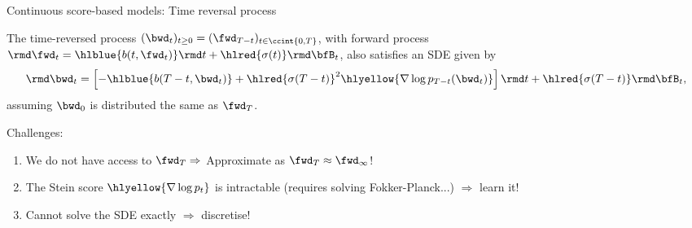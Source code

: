 \begin{frame}{Continuous score-based models: Time reversal process}
\vspace{-0.2em}
\vspace{5mm}
\begin{theorem}{\cite{cattiaux2021time,haussmann1986time}}{}
The time-reversed process
$(\bwd_t)_{t \geq 0} = (\fwd_{T-t})_{t \in \ccint{0,T}}$, 
with forward process $\rmd \fwd_t = \hlblue{b(t, \fwd_t)} \rmd t + \hlred{\sigma(t)} \rmd \bfB_t$,
also satisfies an SDE given by
\begin{equation*}
\label{eq:backward_SDE}
  \rmd \bwd_t = \left[ -\hlblue{b(T-t,\bwd_t)} + \hlred{\sigma(T-t)}^2 \hlyellow{\nabla \log p_{T-t}(\bwd_t)}\right] \rmd t + \hlred{\sigma(T-t)} \rmd \bfB_t,
\end{equation*}
assuming $ \bwd_0$ is distributed the same as $\fwd_T$.
\end{theorem}
%
\pause
%
Challenges:
\vspace{-0.5em}
\begin{enumerate}
    \item We do not have access to $\fwd_T \Rightarrow$ Approximate as $\fwd_T \approx \fwd_\infty$!
    \item The Stein score $\hlyellow{\nabla \log p_t}$ is intractable (requires solving Fokker-Planck...) $\Rightarrow$ learn it!
    \item Cannot solve the SDE exactly $\Rightarrow$ discretise!
\end{enumerate}
%
\end{frame}




